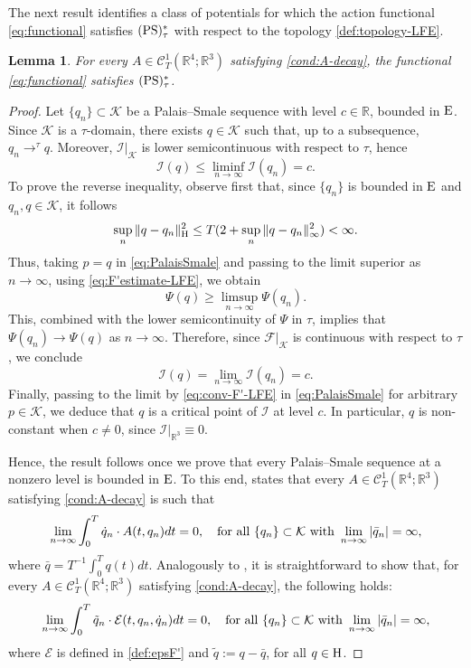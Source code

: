 \documentclass{article}
\newcommand{\boK}{\mathcal{K}}
\newcommand{\boI}{\mathcal{I}}
\newcommand{\R}{\mathbb{R}}
\newcommand{\boF}{\mathcal{F}}
\newcommand{\boE}{\mathcal{E}}
\newcommand{\dq}{\dot{q}}
\newcommand{\Hilb}{{\textnormal H}}
\newcommand{\Ebanach}{{\textnormal E}}
\newcommand{\PS}{(\textnormal{PS})^{*}_\tau}
\newtheorem{lemma}{Lemma}[section]
\theoremstyle{definition}
\begin{document}
	The next result identifies a class of potentials for which the action functional \eqref{eq:functional} satisfies $\PS$ with respect to the topology \eqref{def:topology-LFE}.
	
	\begin{lemma}\label{lemma:PS2}
		For every $A\in\mathcal{C}_T^1(\R^4;\R^3)$ satisfying \eqref{cond:A-decay}, the functional \eqref{eq:functional} satisfies $\PS$.
	\end{lemma}
	
	
	\begin{proof}
		Let $\{q_n\}\subset\boK$ be a Palais--Smale sequence with level $c\in\R$, bounded in $\Ebanach$. Since $\boK$ is a $\tau$-domain, there exists $q\in\boK$ such that, up to a subsequence, $q_n\to^\tau q$. Moreover, $\boI|_\boK$ is lower semicontinuous with respect to $\tau$, hence
		\begin{equation}
			\boI(q)\leq\liminf_{n\to\infty}\boI(q_n)=c.
		\end{equation}
		To prove the reverse inequality, observe first that, since $\{q_n\}$ is bounded in $\Ebanach$ and $q_n,q\in\boK$, it follows
			\[\sup_{n}\|q-q_n\|^2_\Hilb\leq T(2+\sup_n\|q-q_n\|_\infty^2)<\infty.\]
			Thus, taking $p=q$ in \eqref{eq:PalaisSmale} and passing to the limit superior as $n\to\infty$, using \eqref{eq:F'estimate-LFE}, we obtain 
			\begin{equation}
				\Psi(q)\geq\limsup_{n\to\infty}\Psi(q_n).
			\end{equation}
			This, combined with the lower semicontinuity of $\Psi$ in $\tau$, implies that $\Psi(q_n)\to\Psi(q)$ as $n\to\infty$. Therefore, since $\boF|_\boK$ is continuous with respect to $\tau$, we conclude
			\begin{equation*}
				\boI(q)=\lim_{n\to\infty}\boI(q_n)=c.
			\end{equation*}
		Finally, passing to the limit by \eqref{eq:conv-F'-LFE} in \eqref{eq:PalaisSmale} for arbitrary $p\in\boK$, we deduce that $q$ is a critical point of $\boI$ at level $c$. In particular, $q$ is non-constant when $c\neq0$, since $\boI|_{\R^3}\equiv0$.
		
		Hence, the result follows once we prove that every Palais--Smale sequence at a nonzero level is bounded in $\Ebanach$. To this end, \cite[Lemma 3.4]{GLM} states that every $A\in\mathcal{C}_T^1(\R^4;\R^3)$ satisfying \eqref{cond:A-decay} is such that
		\begin{equation}\label{statement:vanishingA}
			\lim_{n\to\infty}\int_0^T \dq_n\cdot A(t,q_n)dt= 0,\quad\hbox{for all }\{q_n\}\subset\boK\hbox{ with }\lim_{n\to\infty}|\bar{q}_n|=\infty,
		\end{equation}
		where $\bar{q}=T^{-1}\int_0^Tq(t)dt$. Analogously to \cite[Lemma 3.4]{GLM}, it is straightforward to show that, for every $A\in\mathcal{C}_T^1(\R^4;\R^3)$ satisfying \eqref{cond:A-decay}, the following holds:
		\begin{equation}\label{statement:vanishingE}
			\lim_{n\to\infty}\int_0^T  \tilde q_n\cdot\boE(t,q_n,\dq_n) dt= 0,\quad\hbox{for all }\{q_n\}\subset\boK\hbox{ with }\lim_{n\to\infty}|\bar{q}_n|=\infty,
		\end{equation}
		where $\boE$ is defined in \eqref{def:epsF'} and $\tilde q:=q-\bar{q}$, for all $q\in\Hilb$.
		

\end{proof}
\end{document}

